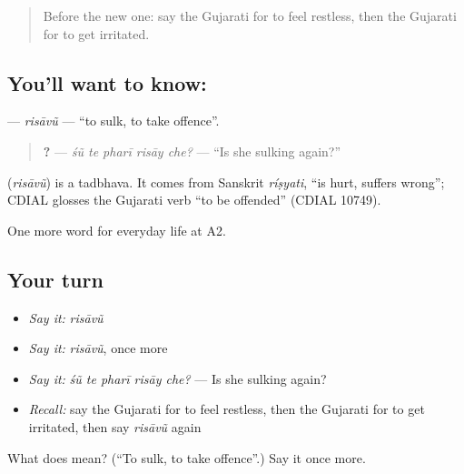 \label{lesson:GU-C267-risavu}



\begin{quote}
Before the new one: say the Gujarati for to feel restless, then the Gujarati for to get irritated.
\end{quote}

\subsection*{You'll want to know: }
\textbf{} — \emph{risāvũ} — \textquotedblleft{}to sulk, to take offence\textquotedblright{}.

\begin{quote}
\textbf{    ?} — \emph{śũ te pharī risāy che?} — \textquotedblleft{}Is she sulking again?\textquotedblright{}
\end{quote}

\begin{cousinweb}
\textbf{} (\emph{risāvũ}) is a tadbhava. It comes from Sanskrit \emph{ríṣyati}, \textquotedblleft{}is hurt, suffers wrong\textquotedblright{}; CDIAL glosses the Gujarati verb \textquotedblleft{}to be offended\textquotedblright{} (CDIAL 10749).
\end{cousinweb}

\begin{grammarlens}[title={What you've built}]
One more word for everyday life at A2.
\end{grammarlens}

\subsection*{Your turn}
\begin{itemize}
\raggedright
  \item \emph{Say it:} \emph{risāvũ}
  \item \emph{Say it:} \emph{risāvũ}, once more
  \item \emph{Say it:} \emph{śũ te pharī risāy che?} — Is she sulking again?
  \item \emph{Recall:} say the Gujarati for to feel restless, then the Gujarati for to get irritated, then say \emph{risāvũ} again
\end{itemize}

\begin{tcolorbox}[breakable,colback=teal!4,colframe=teal!35!black,title={Before you move on}]
What does  mean? (\textquotedblleft{}To sulk, to take offence\textquotedblright{}.) Say it once more.
\end{tcolorbox}
